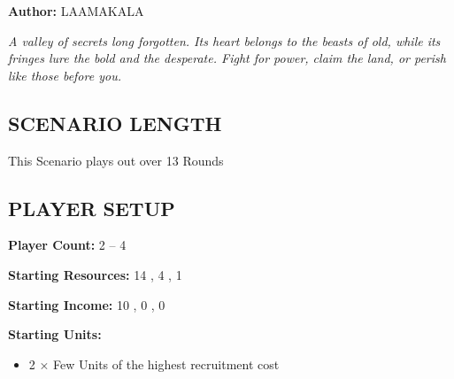 
\begin{multicols*}{2}

\textbf{Author:} LAAMAKALA


\textit{A valley of secrets long forgotten. Its heart belongs to the beasts of old, while its fringes lure the bold and the desperate. Fight for power, claim the land, or perish like those before you.}


\subsection*{\MakeUppercase{Scenario Length}}
This Scenario plays out over 13 Rounds

\subsection*{\MakeUppercase{Player Setup}}
\textbf{Player Count:} 2 -- 4

\textbf{Starting Resources:} 14 , 4 , 1 

\textbf{Starting Income:} 10 , 0 , 0 

\textbf{Starting Units:}
\begin{itemize}
  \item 2 × Few  Units of the highest recruitment cost
\end{itemize}


\end{multicols*}
